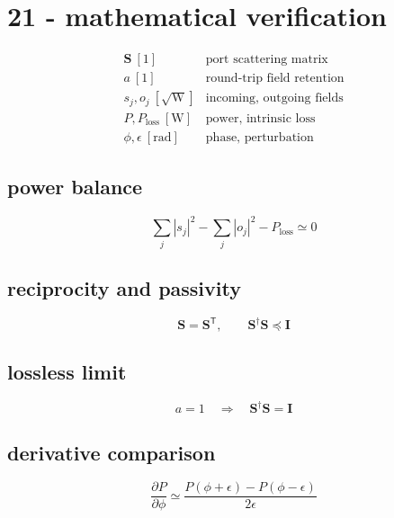 \section*{21 - mathematical verification}

\[
\begin{array}{ll}\mathbf S\ [1]&\text{port scattering matrix}\\[0.6em]a\ [1]&\text{round-trip field retention}\\[0.6em]s_j,o_j\ [\sqrt{\mathrm W}]&\text{incoming, outgoing fields}\\[0.6em]P,P_{\mathrm{loss}}\ [\mathrm W]&\text{power, intrinsic loss}\\[0.6em]\phi,\epsilon\ [\mathrm{rad}]&\text{phase, perturbation}\end{array}
\]

\subsection*{power balance}
\[
\displaystyle \sum_j|s_j|^2-\sum_j|o_j|^2-P_{\mathrm{loss}}\simeq0
\]

\subsection*{reciprocity and passivity}
\[
\displaystyle \mathbf S=\mathbf S^{\mathsf T},\qquad\mathbf S^\dagger\mathbf S\preceq\mathbf I
\]

\subsection*{lossless limit}
\[
\displaystyle a=1\quad\Longrightarrow\quad\mathbf S^\dagger\mathbf S=\mathbf I
\]

\subsection*{derivative comparison}
\[
\displaystyle \frac{\partial P}{\partial\phi}\simeq\frac{P(\phi+\epsilon)-P(\phi-\epsilon)}{2\epsilon}
\]
